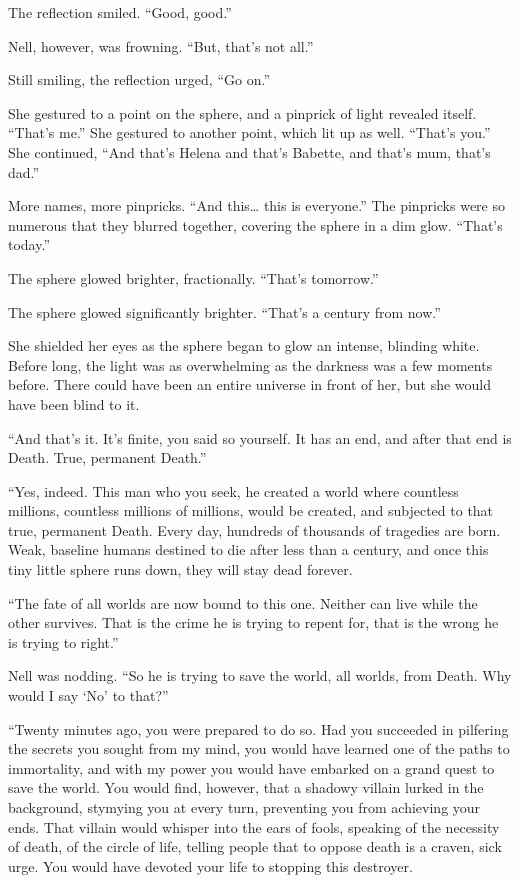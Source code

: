 The reflection smiled. “Good, good.”

Nell, however, was frowning. “But, that’s not all.”

Still smiling, the reflection urged, “Go on.”

She gestured to a point on the sphere, and a pinprick of light revealed itself. “That’s me.” She gestured to another point, which lit up as well. “That’s you.” She continued, “And that’s Helena and that’s Babette, and that’s mum, that’s dad.”

More names, more pinpricks. “And this… this is everyone.” The pinpricks were so numerous that they blurred together, covering the sphere in a dim glow. “That’s today.”

The sphere glowed brighter, fractionally. “That’s tomorrow.”

The sphere glowed significantly brighter. “That’s a century from now.”

She shielded her eyes as the sphere began to glow an intense, blinding white. Before long, the light was as overwhelming as the darkness was a few moments before. There could have been an entire universe in front of her, but she would have been blind to it.

“And that’s it. It’s finite, you said so yourself. It has an end, and after that end is Death. True, permanent Death.”

“Yes, indeed. This man who  you seek, he created a world where countless millions, countless millions of millions, would be created, and subjected to that true, permanent Death. Every day, hundreds of thousands of tragedies are born. Weak, baseline humans destined to die after less than a century, and once this tiny little sphere runs down, they will stay dead forever.

“The fate of all worlds are now bound to this one. Neither can live while the other survives. That is the crime he is trying to repent for, that is the wrong he is trying to right.”

Nell was nodding. “So he is trying to save the world, all worlds, from Death. Why would I say ‘No’ to that?”

“Twenty minutes ago, you were prepared to do so. Had you succeeded in pilfering the secrets you sought from my mind, you would have learned one of the paths to immortality, and with my power you would have embarked on a grand quest to save the world. You would find, however, that a shadowy villain lurked in the background, stymying you at every turn, preventing you from achieving your ends. That villain would whisper into the ears of fools, speaking of the necessity of death, of the circle of life, telling people that to oppose death is a craven, sick urge. You would have devoted your life to stopping this destroyer.

